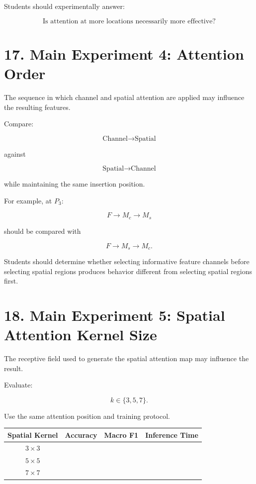 \documentclass[10pt]{article}
\begin{document}
Students should experimentally answer:

\[
\boxed{
\text{Is attention at more locations necessarily more effective?}
}
\]

\section*{17. Main Experiment 4: Attention Order}

The sequence in which channel and spatial attention are applied may influence
the resulting features.

Compare:

\[
\boxed{
\text{Channel}
\rightarrow
\text{Spatial}
}
\]

against

\[
\boxed{
\text{Spatial}
\rightarrow
\text{Channel}
}
\]

while maintaining the same insertion position.

For example, at $P_3$:

\[
F
\rightarrow
M_c
\rightarrow
M_s
\]

should be compared with

\[
F
\rightarrow
M_s
\rightarrow
M_c.
\]

Students should determine whether selecting informative feature channels
before selecting spatial regions produces behavior different from selecting
spatial regions first.

\section*{18. Main Experiment 5: Spatial Attention Kernel Size}

The receptive field used to generate the spatial attention map may influence
the result.

Evaluate:

\[
k\in\{3,5,7\}.
\]

Use the same attention position and training protocol.

\begin{center}

\begin{tabular}{|c|c|c|c|}
\hline

\textbf{Spatial Kernel}
&
\textbf{Accuracy}
&
\textbf{Macro F1}
&
\textbf{Inference Time}
\\
\hline

$3\times3$
&
&
&
\\
\hline

$5\times5$
&
&
&
\\
\hline

$7\times7$
&
&
&
\\
\hline

\end{tabular}

\end{center}
\end{document}
